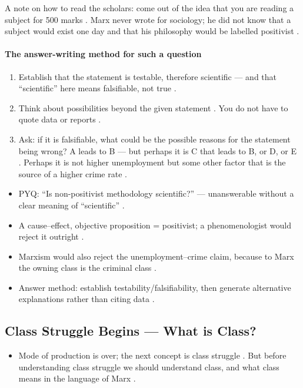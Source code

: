 \begin{CriticalPoint}
A note on how to read the scholars: come out of the idea that you are reading a subject for 500 marks . Marx never wrote for sociology; he did not know that a subject would exist one day and that his philosophy would be labelled positivist .
\end{CriticalPoint}

\paragraph{The answer-writing method for such a question}
\begin{enumerate}
    \item Establish that the statement is testable, therefore scientific --- and that ``scientific'' here means falsifiable, not true .
    \item Think about possibilities beyond the given statement . You do not have to quote data or reports .
    \item Ask: if it is falsifiable, what could be the possible reasons for the statement being wrong? A leads to B --- but perhaps it is C that leads to B, or D, or E . Perhaps it is not higher unemployment but some other factor that is the source of a higher crime rate .
\end{enumerate}

\begin{QuickRevision}
\begin{itemize}
    \item PYQ: ``Is non-positivist methodology scientific?'' --- unanswerable without a clear meaning of ``scientific'' .
    \item A cause--effect, objective proposition = positivist; a phenomenologist would reject it outright .
    \item Marxism would also reject the unemployment--crime claim, because to Marx the owning class is the criminal class .
    \item Answer method: establish testability/falsifiability, then generate alternative explanations rather than citing data .
\end{itemize}
\end{QuickRevision}

\subsection{Class Struggle Begins --- What is Class?}
\begin{itemize}
    \item Mode of production is over; the next concept is class struggle . But before understanding class struggle we should understand class, and what class means in the language of Marx .
\end{itemize}


